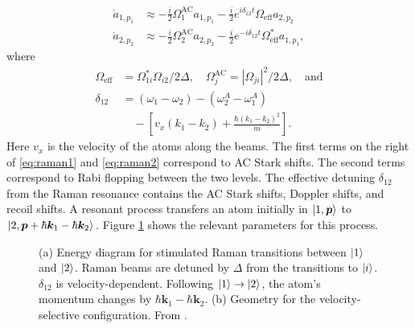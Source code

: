 \documentclass[reprint,
nofootinbib,
amsmath,amssymb,
aps]{revtex4-1}
\newcommand{\f}[2]{\frac{#1}{#2}}
\newcommand{\lb}{\left[}
\newcommand{\rb}{\right]}
\begin{document}
\begin{align}
\dot{a}_{1,p_1} &\approx -\f{i}{2}\Omega_1^{\text{AC}} a_{1,p_1} - \f{i}{2}e^{i\delta_{12} t} \Omega_\text{eff} a_{2,p_2}\label{eq:raman1}\\
\dot{a}_{2,p_2} &\approx -\f{i}{2}\Omega_2^{\text{AC}} a_{2,p_2} - \f{i}{2}e^{-i\delta_{12} t} \Omega_{\text{eff}}^* a_{1,p_1}\label{eq:raman2},
\end{align}
where  
\begin{align*}
\Omega_\text{eff} &= \Omega_{1i}^* \Omega_{i2}/2\Delta, \quad \Omega_j^{\text{AC}} = |\Omega_{ji}|^2/2\Delta, \quad \text{and}\\
\delta_{12} &= (\omega_1 - \omega_2) - (\omega_2^A - \omega_1^A)\\
&\quad- \lb  v_x(k_1-k_2) + \f{\hbar (k_1 - k_2)^2}{ m} \rb.
\end{align*}
Here $v_x$ is the velocity of the atoms along the beams. The first terms on the right of \eqref{eq:raman1} and \eqref{eq:raman2} correspond to AC Stark shifts. The second terms correspond to Rabi flopping between the two levels. The effective detuning $\delta_{12}$ from the Raman resonance contains the AC Stark shifts, Doppler shifts, and recoil shifts. A resonant process transfers an atom initially in $\ket{1,\bm{p}}$ to $\ket{2, \bm{p} + \hbar \bm{k}_1 - \hbar \bm{k}_2}$. Figure \ref{fig:Raman} shows the relevant parameters for this process. 
 

\begin{figure}
	\quad
	\caption{(a) Energy diagram for stimulated Raman transitions between $\ket{1}$ and $\ket{2}$. Raman beams are detuned by $\Delta$ from the transitions to $\ket{i}$. $\delta_{12}$ is velocity-dependent. Following $\ket{1} \to \ket{2}$, the atom's momentum changes by $\hbar \bm{k}_1 - \hbar \bm{k}_2$. (b) Geometry for the velocity-selective configuration. From \cite{kasevich1992measurement}.}
	\label{fig:Raman}
\end{figure}
\end{document}
